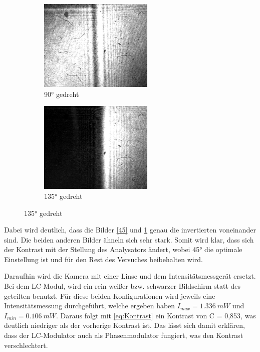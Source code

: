 \begin{figure}
	\begin{subfigure}[]{0.5\textwidth}
		\includegraphics[width=0.6\textwidth]{4.1.2_90Grad.png}
		\caption{90° gedreht}
	\end{subfigure}
	\begin{subfigure}[]{0.5\textwidth}
		\includegraphics[width=0.6\textwidth]{4.1.2_135Grad.png}
		\caption{135° gedreht}
		\label{135}
	\end{subfigure}
\label{Kontrast}
\end{figure}

Dabei wird deutlich, dass die Bilder \cref{45} und \cref{135} genau die invertierten voneinander sind. Die beiden anderen Bilder ähneln sich sehr stark. Somit wird klar, dass sich der Kontrast mit der Stellung des Analysators ändert, wobei 45° die optimale Einstellung ist und für den Rest des Versuches beibehalten wird. 

Daraufhin wird die Kamera mit einer Linse und dem Intensitätsmessgerät ersetzt. Bei dem LC-Modul, wird ein rein weißer bzw. schwarzer Bildschirm statt des geteilten benutzt. Für diese beiden Konfigurationen wird jeweils eine Intensitätsmessung durchgeführt, welche ergeben haben $I_{max} = \SI{1,336}{mW}$ und $I_{min} = \SI{0,106}{mW}$. Daraus folgt mit \cref{eq:Kontrast} ein Kontrast von C = 0,853, was deutlich niedriger als der vorherige Kontrast ist. 
Das lässt sich damit erklären, dass der LC-Modulator auch als Phasenmodulator fungiert, was den Kontrast verschlechtert.
